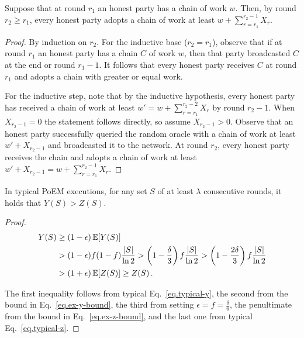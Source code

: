 \begin{lemma}
  Suppose that at round $r_1$ an honest party has a chain of work $w$.
  Then, by round $r_2 \geq r_1$, every honest party adopts a chain of work at least
  $w + \sum_{r = r_1}^{r_2 - 1}{X_r}$.
\end{lemma}
\begin{proof}
  By induction on $r_2$. For the inductive base ($r_2 = r_1$), observe that
  if at round $r_1$ an honest party has a chain $C$ of work $w$, then
  that party broadcasted $C$ at the end or round $r_1 - 1$. It follows that
  every honest party receives $C$ at round $r_1$ and adopts a chain with
  greater or equal work.

  For the inductive step, note that by the inductive hypothesis,
  every honest party has received a chain of work at least $w' = w + \sum_{r = r_1}^{r_2 - 2}{X_r}$
  by round $r_2 - 1$. When $X_{r_2 - 1} = 0$ the statement follows directly, so assume
  $X_{r_2 - 1} > 0$. Observe that an honest party successfully queried the random oracle
  with a chain of work at least $w' + X_{r_2 - 1}$ and broadcasted it to the network.
  At round $r_2$, every honest party receives the chain and adopts a chain
  of work at least $w' + X_{r_2 - 1} = w + \sum_{r = r_1}^{r_2 - 1}{X_r}$. \Qed
\end{proof}

\begin{lemma} \label{lem:typical-bounds}
  In typical PoEM executions, for any set $S$ of at least $\lambda$ consecutive rounds,
  it holds that $Y(S) > Z(S)$.
\end{lemma}
\begin{proof}
  \begin{align*}
    Y(S) &\geq (1 - \epsilon)\mathop{{}\mathbb{E}}[Y(S)]\\
         &> (1 - \epsilon) f (1 - f) \frac{|S|}{\ln2}
          > \left(1 - \frac{\delta}{3}\right) f \frac{|S|}{\ln2}
          > \left(1 - \frac{2\delta}{3}\right) f \frac{|S|}{\ln2}\\
         &> (1 + \epsilon)\mathop{{}\mathbb{E}}[Z(S)] \geq Z(S)\,.
  \end{align*}

  The first inequality follows from typical Eq.~\ref{eq.typical-y},
  the second from the bound in Eq.~\ref{eq.ex-y-bound},
  the third from setting $\epsilon = f = \frac{\delta}{6}$,
  the penultimate from the bound in Eq.~\ref{eq.ex-z-bound},
  and the last one from typical Eq.~\ref{eq.typical-z}.
  \Qed
\end{proof}


